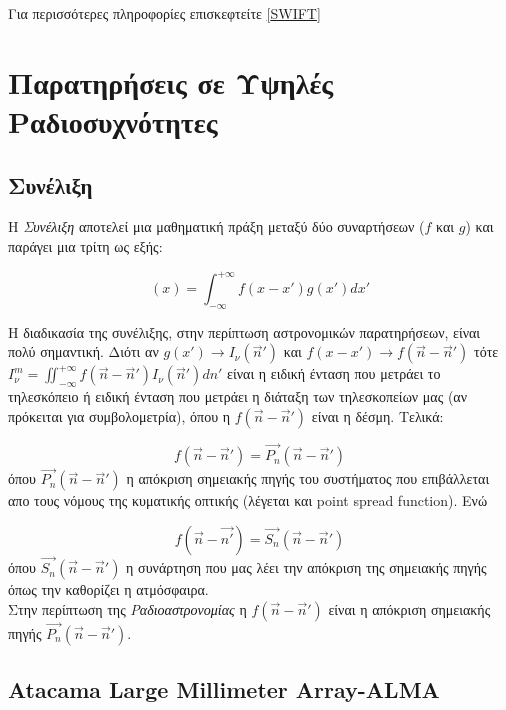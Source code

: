 Για περισσότερες πληροφορίες επισκεφτείτε \href{http://ascl.net/1303.001}{[{\en SWIFT}]}

\newpage
\section{Παρατηρήσεις σε Υψηλές Ραδιοσυχνότητες}

\subsection{Συνέλιξη}

Η {\it Συνέλιξη} αποτελεί μια μαθηματική πράξη μεταξύ δύο συναρτήσεων ($f$ και $g$) και παράγει μια τρίτη ως εξής:

\begin{equation}
[f\ast g](x) = \int_{- \infty}^{+ \infty} f(x-x')g(x') dx'
\end{equation}\label{Convolution}

Η διαδικασία της συνέλιξης, στην περίπτωση αστρονομικών παρατηρήσεων, είναι πολύ σημαντική. Διότι αν $g(x') \rightarrow I_{\nu}(\vec{n}')$ και $f(x-x') \rightarrow f(\vec{n}-\vec{n}')$ τότε $I^{m}_{\nu}= \iint_{- \infty}^{+ \infty} f(\vec{n}-\vec{n}')I_{\nu}(\vec{n}') dn'$ είναι η ειδική ένταση που μετράει το τηλεσκόπειο ή ειδική ένταση που μετράει η διάταξη των τηλεσκοπείων μας (αν πρόκειται για συμβολομετρία), όπου η $f(\vec{n}-\vec{n}')$ είναι η δέσμη. Τελικά:

\begin{equation}\label{beamRadio}
f(\vec{n}-\vec{n}') = \vec{P_n} (\vec{n}-\vec{n}')
\end{equation}
όπου $\vec{P_n} (\vec{n}-\vec{n}')$ η απόκριση σημειακής πηγής του συστήματος που επιβάλλεται απο τους νόμους της κυματικής οπτικής (λέγεται και {\en point spread function}). Ενώ

\begin{equation}\label{beamOptical}
f(\vec{n}-\vec{n'}) = \vec{S_n} (\vec{n}-\vec{n}')
\end{equation}
όπου $\vec{S_n} (\vec{n}-\vec{n}')$ η συνάρτηση που μας λέει την απόκριση της σημειακής πηγής όπως την καθορίζει η ατμόσφαιρα.\\

Στην περίπτωση της {\it Ραδιοαστρονομίας} η $f(\vec{n}-\vec{n}')$ είναι η απόκριση σημειακής πηγής $\vec{P_n} (\vec{n}-\vec{n}')$.


\en
\subsection{Atacama Large Millimeter Array-ALMA}

